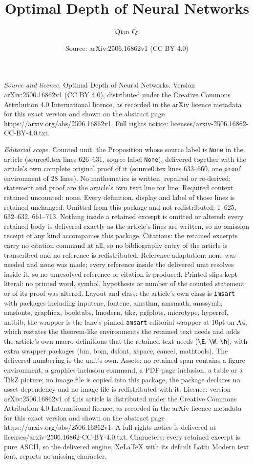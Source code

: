 \documentclass[10pt,a4paper]{amsart}
\title[Optimal Depth of Neural Networks]{Optimal Depth of Neural Networks}
\author{Qian Qi}
\date{Source: arXiv:2506.16862v1 (CC BY 4.0)}
\begin{document}
\maketitle

\noindent\emph{Source and licence.} Optimal Depth of Neural Networks. Version arXiv:2506.16862v1 (CC BY 4.0), distributed under the Creative Commons Attribution 4.0 International licence, as recorded in the arXiv licence metadata for this exact version and shown on the abstract page https://arxiv.org/abs/2506.16862v1. Full rights notice: licenses/arxiv-2506.16862-CC-BY-4.0.txt.\par\smallskip

\noindent\textit{Editorial scope.} Counted unit: the Proposition whose source label is \texttt{None} in the article (source0.tex lines 626--631, source label \texttt{None}), delivered together with the article's own complete original proof of it (source0.tex lines 633--660, one \texttt{proof} environment of 28 lines). No mathematics is written, repaired or re-derived: statement and proof are the article's own text line for line. Required context retained uncounted: none. Every definition, display and label of those lines is retained unchanged. Omitted from this package and not redistributed: 1--625, 632--632, 661--713. Nothing inside a retained excerpt is omitted or altered: every retained body is delivered exactly as the article's lines are written, so no omission receipt of any kind accompanies this package. Citations: the retained excerpts carry no citation command at all, so no bibliography entry of the article is transcribed and no reference is redistributed. Reference adaptation: none was needed and none was made; every reference inside the delivered unit resolves inside it, so no unresolved reference or citation is produced. Printed slips kept literal: no printed word, symbol, hypothesis or number of the counted statement or of its proof was altered. Layout and class: the article's own class is \texttt{imsart} with packages including inputenc, fontenc, amsthm, amsmath, amssymb, amsfonts, graphicx, booktabs, lmodern, tikz, pgfplots, microtype, hyperref, natbib; the wrapper is the lane's pinned \texttt{amsart} editorial wrapper at 10pt on A4, which restates the theorem-like environments the retained text needs and adds the article's own macro definitions that the retained text needs (\texttt{\textbackslash E}, \texttt{\textbackslash W}, \texttt{\textbackslash h}), with extra wrapper packages (bm, bbm, dsfont, xspace, cancel, mathtools). The delivered numbering is the unit's own. Assets: no retained span contains a figure environment, a graphics-inclusion command, a PDF-page inclusion, a table or a TikZ picture; no image file is copied into this package, the package declares no asset dependency and no image file is redistributed with it. Licence: version arXiv:2506.16862v1 of this article is distributed under the Creative Commons Attribution 4.0 International licence, as recorded in the arXiv licence metadata for this exact version and shown on the abstract page https://arxiv.org/abs/2506.16862v1. A full rights notice is delivered at licenses/arxiv-2506.16862-CC-BY-4.0.txt. Characters: every retained excerpt is pure ASCII, so the delivered engine, XeLaTeX with its default Latin Modern text font, reports no missing character.
\end{document}
